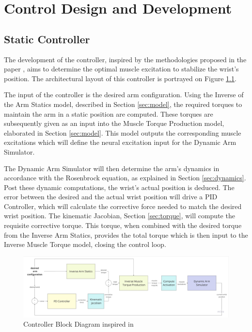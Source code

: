 \chapter{Control Design and Development}



\section{Static Controller} \label{NeuralController}

The development of the controller, inspired by the methodologies proposed in the paper \cite{QSC}, aims to determine the optimal muscle excitation to stabilize the wrist's position. The architectural layout of this controller is portrayed on Figure \ref{fig:BDC}.

The input of the controller is the desired arm configuration. Using the Inverse of the Arm Statics model, described in Section \ref{sec:model}, the required torques to maintain the arm in a static position are computed. These torques are subsequently given as an input into the Muscle Torque Production model, elaborated in Section \ref{sec:model}. This model outputs the corresponding muscle excitations which will define the neural excitation input for the Dynamic Arm Simulator. 

The Dynamic Arm Simulator will then determine the arm's dynamics in accordance with the Rosenbrock equation, as explained in Section \ref{sec:dynamics}. Post these dynamic computations, the wrist's actual position is deduced. The error between the desired and the actual wrist position will drive a PID Controller, which will calculate the corrective force needed to match the desired wrist position. The kinematic Jacobian, Section \ref{sec:torque}, will compute the requisite corrective torque. This torque, when combined with the desired torque from the Inverse Arm Statics, provides the total torque which is then input to the Inverse Muscle Torque model, closing the control loop. 


\begin{figure}[h!]
    \centering
    \includegraphics[width=1\textwidth]{Pictures/Controller/controller-diagram.jpg}
    \caption{Controller Block Diagram inspired in \cite{QSC}}
    \label{fig:BDC}
\end{figure}

